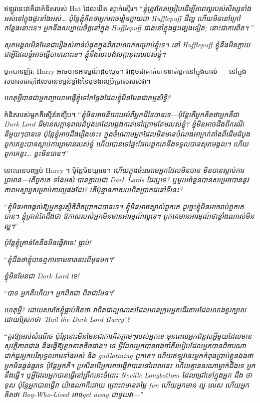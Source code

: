 {{{ឥឡូវនេះវាគឺជាគំនិតរបស់ Hat ដែលយឺត ស្ទាក់ស្ទើរ។ “\emph{ខ្ញុំត្រូវតែតម្រៀបដើម្បីភាពល្អរបស់សិស្សទាំងអស់នៅក្នុងផ្ទះទាំងអស់… ប៉ុន្តែខ្ញុំគិតថាអ្នកអាចរៀនក្លាយជា Hufflepuff ដ៏ល្អ ហើយមិននៅក្រៅកន្លែងនោះទេ។ អ្នកនឹងសប្បាយចិត្តនៅក្នុង Hufflepuff ជាងនៅក្នុងផ្ទះផ្សេងទៀត; នោះជាការពិត។ }”

\emph{សុភមង្គលមិនមែនជារឿងសំខាន់បំផុតក្នុងពិភពលោកសម្រាប់ខ្ញុំទេ។ នៅ Hufflepuff ខ្ញុំនឹងមិនក្លាយជាអ្វីដែលខ្ញុំអាចធ្វើបាននោះទេ។ ខ្ញុំនឹងលះបង់សក្តានុពលរបស់ខ្ញុំ។}

មួកបានញ័រ; Harry អាចមានអារម្មណ៍ដូចម្ដេច។ វាដូចជាគាត់បានទាត់មួកនៅក្នុងបាល់ — នៅក្នុងសមាសធាតុដែលមានទម្ងន់ខ្លាំងនៃមុខងារប្រើប្រាស់របស់វា។

\emph{ហេតុអ្វីបានជាអ្នកព្យាយាមផ្ញើខ្ញុំទៅកន្លែងដែលខ្ញុំមិនមែនជាកម្មសិទ្ធិ?}

គំនិតរបស់មួកគឺស្ទើរតែខ្សឹប។ “\emph{ខ្ញុំមិនអាចនិយាយអំពីអ្នកដ៏ទៃបានទេ—ប៉ុន្តែតើអ្នកគិតថាអ្នកគឺជា Dark Lord ដ៏មានសក្តានុពលដំបូងគេដែលឆ្លងកាត់នៅក្រោមគែមរបស់ខ្ញុំ? ខ្ញុំមិនអាចដឹងពីករណីនីមួយៗបានទេ ប៉ុន្តែខ្ញុំអាចដឹងរឿងនេះ៖ ក្នុងចំណោមអ្នកដែលមិនមានបំណងអាក្រក់តាំងពីដើមដំបូង ពួកគេខ្លះបានស្តាប់ការព្រមានរបស់ខ្ញុំ ហើយបានទៅផ្ទះដែលពួកគេនឹងទទួលបានសុភមង្គល។ ហើយពួកគេខ្លះ… ខ្លះមិនបាន។}”

នោះបានបញ្ឈប់ Harry ។ ប៉ុន្តែមិនយូរទេ។ \emph{ហើយក្នុងចំណោមអ្នកដែលមិនបាន \emph{មិន}បានស្តាប់ការព្រមាន—តើពួកគេ \emph{ទាំងអស់} បានក្លាយជា Dark Lords ដែរឬទេ? ឬ​មួយ​ចំនួន​បាន​សម្រេច​បាន​នូវ​ភាព​អស្ចារ្យ​សម្រាប់​ការ​ល្អ​ផង​ដែរ? តើប៉ុន្មានភាគរយពិតប្រាកដនៅទីនេះ?}

“\emph{ខ្ញុំមិនអាចផ្តល់ឱ្យអ្នកនូវស្ថិតិពិតប្រាកដបានទេ។ ខ្ញុំ​មិន​អាច​ស្គាល់​ពួក​គេ ដូច្នេះ​ខ្ញុំ​មិន​អាច​រាប់​ពួក​គេ​បាន។ ខ្ញុំគ្រាន់តែដឹងថា ឱកាសរបស់អ្នកមិនមានអារម្មណ៍ល្អទេ។ ពួកគេមានអារម្មណ៍ថា\emph{ខ្លាំងណាស់}មិនល្អ។}”

\emph{ប៉ុន្តែខ្ញុំគ្រាន់តែនឹងមិនធ្វើវាទេ! ធ្លាប់!}

“\emph{ខ្ញុំដឹងថាខ្ញុំបានឮការទាមទារនោះពីមុនមក។}”

\emph{ខ្ញុំមិនមែនជា Dark Lord ទេ!}

“\emph{បាទ អ្នកគឺហើយ។ អ្នកពិតជា \emph{ពិតជា}មែន។}”

\emph{ហេតុអ្វី? ដោយសារតែខ្ញុំធ្លាប់គិតថា វាពិតជាល្អណាស់ដែលមានក្រុមអ្នកដើរតាមដែលលាងខួរក្បាលដោយស្រែកថា 'Hail the Dark Lord Harry'?}

“\emph{គួរឱ្យអស់សំណើច ប៉ុន្តែនោះមិនមែនជាការគិតភ្លាមៗរបស់អ្នកទេ មុនពេលអ្នកជំនួសអ្វីមួយដែលមានសុវត្ថិភាពជាង និងធ្វើឱ្យខូចខាតតិចជាង។ ទេ អ្វីដែលអ្នកបានចងចាំគឺរបៀបដែលអ្នកបានពិចារណាដាក់ជួរអ្នកបរិសុទ្ធឈាមទាំងអស់ និង guillotining ពួកគេ។ ហើយឥឡូវនេះអ្នកកំពុងប្រាប់ខ្លួនឯងថាអ្នកមិនធ្ងន់ធ្ងរទេ ប៉ុន្តែអ្នកគឺ។ ប្រសិនបើអ្នកអាចធ្វើវាបាននៅពេលនេះ ហើយគ្មាននរណាម្នាក់ដឹងទេ អ្នកនឹងធ្វើ។ ឬអ្វីដែលអ្នកបានធ្វើនៅព្រឹកនេះចំពោះ Neville Longbottom ដែលជ្រៅទៅក្នុងអ្នក \emph{ដឹង} ថាខុស ប៉ុន្តែអ្នកបានធ្វើវា \emph{យ៉ាងណាក៏ដោយ} ព្រោះវាមានតម្លៃ \emph{fun} ហើយអ្នកមាន \emph{ល្អ លេស} ហើយ​អ្នក​គិត​ថា Boy-Who-Lived អាច\emph{get away} ជាមួយ​វា—}”

}}}

